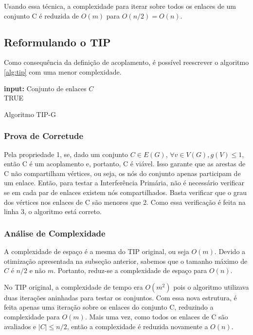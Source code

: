 Usando essa técnica, a complexidade para iterar sobre todos os enlaces de um conjunto C é reduzida de $O(m)$ para $O(n/2)=O(n)$.

\subsection{Reformulando o TIP}

Como consequência da definição de acoplamento, é possível reescrever o algoritmo \ref{alg:tip} com uma menor complexidade.

\begin{algorithm}[h]
	\SetVline
	{\bf input:} Conjunto de enlaces $C$\\
	\Return TRUE
\caption{Algoritmo TIP-G}
\label{alg:tipg}
\end{algorithm}

\subsubsection{Prova de Corretude}

Pela propriedade 1, se, dado um conjunto $C \in E(G)$, $\forall v \in V(G), g(V) \leq 1$, então C é um acoplamento e, portanto, C é viável. Isso garante que as arestas de C não compartilham vértices, ou seja, os nós do conjunto apenas participam de um enlace. Então, para testar a Interferência Primária, não é necessário verificar se em cada par de enlaces existem nós compartilhados. Basta verificar que o grau dos vértices nos enlaces de C são menores que 2. Como essa verificação é feita na linha 3, o algoritmo está correto.

\subsubsection{Análise de Complexidade}

A complexidade de espaço é a mesma do TIP original, ou seja $O(m)$. Devido a otimização apresentada na subseção anterior, sabemos que o tamanho máximo de $C$ é $n/2$ e não $m$. Portanto, reduz-se a complexidade de espaço para $O(n)$. 

No TIP original, a complexidade de tempo era $O(m^2)$ pois o algoritmo utilizava duas iterações aninhadas para testar os conjuntos. Com essa nova estrutura, é feita apenas uma iteração sobre os enlaces do conjunto C, reduzindo a complexidade para $O(m)$. Mais uma vez, como todos os enlaces de C são avaliados e $|C| \leq n/2$, então a complexidade é reduzida novamente  a $O(n)$.

